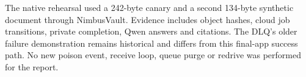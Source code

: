 The native rehearsal used a 242-byte canary and a second 134-byte synthetic document through NimbusVault. Evidence includes object hashes, cloud job transitions, private completion, Qwen answers and citations. The DLQ's older failure demonstration remains historical and differs from this final-app success path. No new poison event, receive loop, queue purge or redrive was performed for the report.
\FloatBarrier
